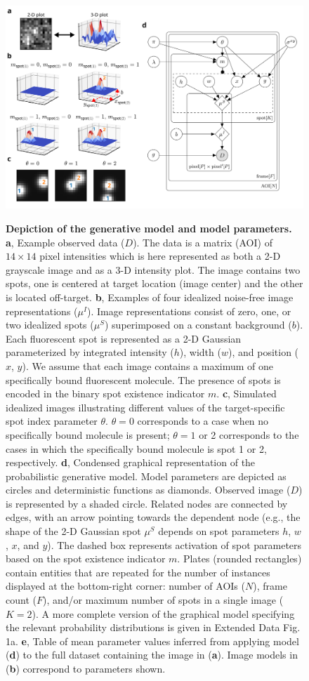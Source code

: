 \begin{figure}[h]
\centering
\includegraphics[width=183mm]{figures/figure2/figure2.png}
\label{fig:tapqir_model}
\caption{\textbf{Depiction of the generative model and model parameters.} \textbf{a}, Example observed data ($D$). The data is a matrix (AOI) of $14 \times 14$ pixel intensities which is here represented as both a 2-D grayscale image and as a 3-D intensity plot. The image contains two spots, one is centered at target location (image center) and the other is located off-target. \textbf{b}, Examples of four idealized noise-free image representations ($\mu^I$). Image representations consist of zero, one, or two idealized spots ($\mu^S$) superimposed on a constant background ($b$). Each fluorescent spot is represented as a 2-D Gaussian parameterized by integrated intensity ($h$), width ($w$), and position ($x$, $y$). We assume that each image contains a maximum of one specifically bound fluorescent molecule. The presence of spots is encoded in the binary spot existence indicator $m$. \textbf{c}, Simulated idealized images illustrating different values of the target-specific spot index parameter $\theta$. $\theta = 0$ corresponds to a case when no specifically bound molecule is present; $\theta = 1$ or 2 corresponds to the cases in which the specifically bound molecule is spot 1 or 2, respectively. \textbf{d}, Condensed graphical representation of the probabilistic generative model. Model parameters are depicted as circles and deterministic functions as diamonds. Observed image ($D$) is represented by a shaded circle. Related nodes are connected by edges, with an arrow pointing towards the dependent node (e.g., the shape of the 2-D Gaussian spot $\mu^S$ depends on spot parameters $h$, $w$, $x$, and $y$). The dashed box represents activation of spot parameters based on the spot existence indicator $m$. Plates (rounded rectangles) contain entities that are repeated for the number of instances displayed at the bottom-right corner: number of AOIs ($N$), frame count ($F$), and/or maximum number of spots in a single image ($K=2$). A more complete version of the graphical model specifying the relevant probability distributions is given in Extended Data Fig. 1a. \textbf{e}, Table of mean parameter values inferred from applying model (\textbf{d}) to the full dataset containing the image in (\textbf{a}). Image models in (\textbf{b}) correspond to parameters shown. }

\end{figure}
